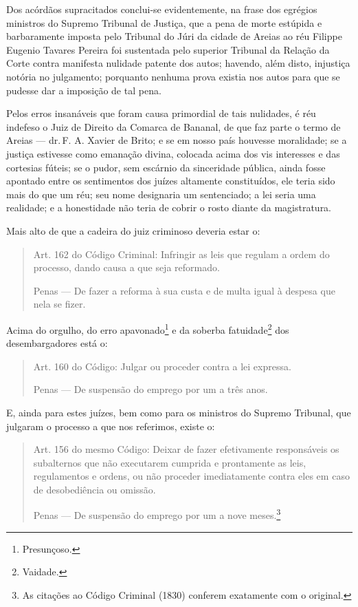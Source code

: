 Dos acórdãos supracitados conclui-se evidentemente, na frase dos
egrégios ministros do Supremo Tribunal de Justiça, que a pena de morte
estúpida e barbaramente imposta pelo Tribunal do Júri da cidade de
Areias ao réu Filippe Eugenio Tavares Pereira foi sustentada pelo
superior Tribunal da Relação da Corte contra manifesta nulidade patente
dos autos; havendo, além disto, injustiça notória no julgamento;
porquanto nenhuma prova existia nos autos para que se pudesse dar a
imposição de tal pena.

Pelos erros insanáveis que foram causa primordial de tais nulidades, é
réu indefeso o Juiz de Direito da Comarca de Bananal, de que faz parte o
termo de Areias --- dr.\,F. A. Xavier de Brito; e se em nosso país
houvesse moralidade; se a justiça estivesse como emanação divina,
colocada acima dos vis interesses e das cortesias fúteis; se o pudor,
sem escárnio da sinceridade pública, ainda fosse apontado entre os
sentimentos dos juízes altamente constituídos, ele teria sido mais do
que um réu; seu nome designaria um sentenciado; a lei seria uma
realidade; e a honestidade não teria de cobrir o rosto diante da
magistratura.

Mais alto de que a cadeira do juiz criminoso deveria estar o:

\begin{quote}
Art. 162 do Código Criminal: Infringir as leis que regulam a ordem do
processo, dando causa a que seja reformado.

Penas --- De fazer a reforma à sua custa e de multa igual à despesa que
nela se fizer.
\end{quote}

Acima do orgulho, do erro apavonado\footnote{Presunçoso.} e da soberba
fatuidade\footnote{Vaidade.} dos desembargadores está o:

\begin{quote}
Art. 160 do Código: Julgar ou proceder contra a lei expressa.

Penas --- De suspensão do emprego por um a três anos.
\end{quote}

E, ainda para estes juízes, bem como para os ministros do Supremo
Tribunal, que julgaram o processo a que nos referimos, existe o:

\begin{quote}
Art. 156 do mesmo Código: Deixar de fazer efetivamente responsáveis os
subalternos que não executarem cumprida e prontamente as leis,
regulamentos e ordens, ou não proceder imediatamente contra eles em caso
de desobediência ou omissão.

Penas --- De suspensão do emprego por um a nove meses.\footnote{As
  citações ao Código Criminal (1830) conferem exatamente com o original.}
\end{quote}

